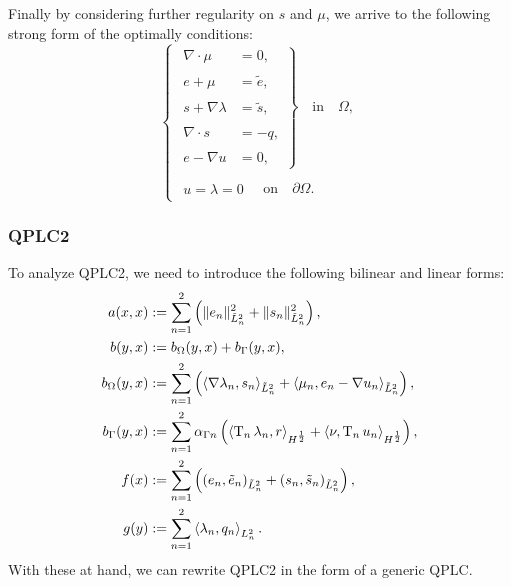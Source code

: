 Finally by considering further regularity on $s$ and $\mu$, we arrive to the following strong form of the optimally conditions:
\begin{equation}    
\left\lbrace
\begin{array}{c}
\left.
\begin{array}{rl}
	\nabla \cdot \mu &=0, \\
    \\
    e+\mu            &=\tilde{e}, \\
    \\
    s+\nabla \lambda &= \tilde{s}, \\
	\\
	\nabla \cdot s   &=-q, \\
    \\
    e-\nabla u       &= 0,
\end{array}
\right\rbrace \quad \textrm{in} \quad \Omega,
\\
\\
\begin{array}{rl}
u = \lambda = 0
\quad \end{array}
\textrm{on} \quad \partial\Omega.
\end{array}
\right. 
\end{equation}

\subsubsection{QPLC2}

To analyze QPLC2, we need to introduce the following bilinear and linear forms:
\begin{align}
    a(x,x) & := \sum_{n=1}^2 \left( \|e_n\|^2_{\tilde{L}^2_n} + \|s_n\|^2_{\tilde{L}^2_n} \right), \\
    b(y,x)    & := b_\Omega(y, x) + b_\Gamma(y, x), \\
    b_\Omega(y,x) &:= \sum_{n=1}^2 \left(\left\langle \nabla \lambda_n, s_n\right\rangle_{\tilde{L}^2_n} + \left\langle \mu_n, e_n-\nabla u_n\right\rangle_{\tilde{L}^2_n} \right),\\
    b_\Gamma(y,x) &:= \sum_{n=1}^2 \alpha_{\Gamma n} \left( \left\langle \operatorname{T}_n\lambda_n, r\right\rangle_{H^\frac12} + \left\langle \nu, \operatorname{T}_n u_n \right\rangle_{H^\frac12}\right),\\
    f(x)   & := \sum_{n=1}^2 \left(\left( e_n , \tilde{e}_n \right)_{\tilde{L}^2_n} + \left( s_n , \tilde{s}_n \right)_{\tilde{L}^2_n} \right), \\
    g(y)   & := \sum_{n=1}^2 \left\langle \lambda_n , q_n \right\rangle_{L^2_n}.
\end{align}
With these at hand, we can rewrite QPLC2 in the form of a generic QPLC.

